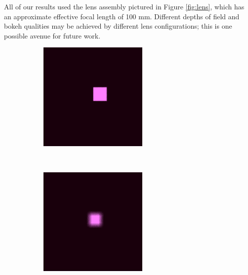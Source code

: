 \documentclass[twocolumn]{article}
\begin{document}
All of our results used the lens assembly pictured in Figure \ref{fig:lens}, which has
an approximate effective focal length of 100 mm. Different depths of field and bokeh
qualities may be achieved by different lens configurations; this is one possible avenue
for future work.

\begin{figure}
    \centering
    \begin{subfigure}[b]{.3\textwidth}
        \includegraphics[width=\textwidth]{img/magenta_square_1_correct.png}
    \end{subfigure} \\
    \begin{subfigure}[b]{.3\textwidth}
        \includegraphics[width=\textwidth]{img/magenta_square_2_correct.png}

\end{subfigure}
\end{figure}
\end{document}

